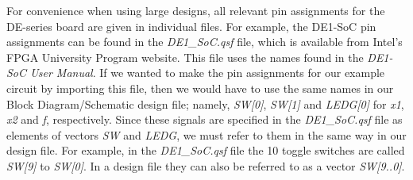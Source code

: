 \documentclass[11pt, twoside, pdftex]{article}
\begin{document}


{\tiny \tableofcontents}
\newpage

















For convenience when using large designs, all relevant pin assignments for the 
DE-series board are given in individual files. For example, the DE1-SoC pin assignments 
can be found in the {\it DE1\_SoC.qsf} file, which is available from Intel's FPGA University
Program website.
This file uses the names found in the {\it DE1-SoC User Manual}.
If we wanted to make the pin assignments for our example circuit by importing
this file, then we would have to use the same names in our 
Block Diagram/Schematic design file;
namely, {\it SW[0]}, {\it SW[1]} and {\it LEDG[0]} for 
{\it x1}, {\it x2} and {\it f}, respectively.
Since these signals are specified in the {\it DE1\_SoC.qsf} file
as elements of vectors {\it SW} and {\it LEDG}, we must refer to them in the same
way in our design file. For example, in the {\it DE1\_SoC.qsf} 
file the 10 toggle switches are called {\it SW[9]} to {\it SW[0]}.
In a design file they can also be referred to as a vector {\it SW[9..0]}.






\end{document}
